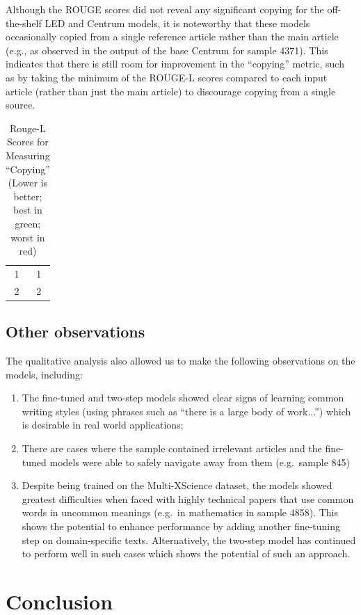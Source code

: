 \documentclass[12pt, twocolumn]{article}
\numberwithin{equation}{section}
\begin{document}
Although the ROUGE scores did not reveal any significant copying for the off-the-shelf LED and Centrum models, it is noteworthy that these models occasionally copied from a single reference article rather than the main article (e.g., as observed in the output of the base Centrum for sample 4371). This indicates that there is still room for improvement in the ``copying'' metric, such as by taking the minimum of the ROUGE-L scores compared to each input article (rather than just the main article) to discourage copying from a single source.

\begin{table}
    \begin{tabular}{|c|c|}
	1 & 1
        \\ 2 & 2
    \end{tabular}
    \caption{Rouge-L Scores for Measuring ``Copying'' (Lower is better; best in green; worst in red)}
    \label{tab:rouge-l-copy}
\end{table}

\subsection{Other observations}
\label{ssec:results-other}

The qualitative analysis also allowed us to make the following observations on the models, including:

\begin{enumerate}
    \item The fine-tuned and two-step models showed clear signs of learning common writing styles (using phrases such as ``there is a large body of work...'') which is desirable in real world applications;
    \item There are cases where the sample contained irrelevant articles and the fine-tuned models were able to safely navigate away from them (e.g.~sample 845)
    \item Despite being trained on the Multi-XScience dataset, the models showed greatest difficulties when faced with highly technical papers that use common words in uncommon meanings (e.g.~in mathematics in sample 4858).  This shows the potential to enhance performance by adding another fine-tuning step on domain-specific texts.  Alternatively, the two-step model has continued to perform well in such cases which shows the potential of such an approach.
\end{enumerate}

\section{Conclusion}
\label{sec:conclusion}
\end{document}
